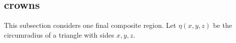 %
%
%
%

\subsection{crowns}

This subsection considers
one final composite region.
Let $\eta(x,y,z)$ be the circumradius of a triangle with
sides $x,y,z$. %

